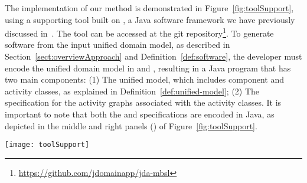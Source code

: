 The implementation of our method is demonstrated in Figure~\ref{fig:toolSupport}, using a supporting tool built on \jdomainapp, a Java software framework we have previously discussed in~\cite{le_domain_2018}. The tool can be accessed at the git repository\footnote{\url{https://github.com/jdomainapp/jda-mbsl}}.
%
To generate software from the input uniﬁed domain model, as described in Section~\ref{sect:overviewApproach} and Deﬁnition~\ref{def:software}, the developer must encode the uniﬁed domain model in \dcsl and \agl, resulting in a Java program that has two main components: (1) The \dcsl uniﬁed model, which includes component and activity classes, as explained in Deﬁnition~\ref{def:unified-model}; (2) The \agl specification for the activity graphs associated with the activity classes. It is important to note that both the \dcsl and \agl specifications are encoded in Java, as depicted in the middle and right panels (\resp) of Figure~\ref{fig:toolSupport}.

\begin{figure*}[ht]
	\centering
	\texttt{[image: toolSupport]}
	\caption{Illustration for the JDomainApp-based realization and usability of \agl.} %
	\vspace{-0.2cm}
	\label{fig:toolSupport}
\end{figure*}

